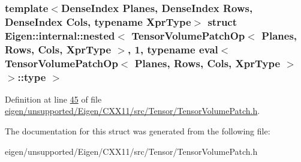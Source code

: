 \subsubsection*{template$<$Dense\+Index Planes, Dense\+Index Rows, Dense\+Index Cols, typename Xpr\+Type$>$\newline
struct Eigen\+::internal\+::nested$<$ Tensor\+Volume\+Patch\+Op$<$ Planes, Rows, Cols, Xpr\+Type $>$, 1, typename eval$<$ Tensor\+Volume\+Patch\+Op$<$ Planes, Rows, Cols, Xpr\+Type $>$ $>$\+::type $>$}



Definition at line \hyperlink{eigen_2unsupported_2_eigen_2_c_x_x11_2src_2_tensor_2_tensor_volume_patch_8h_source_l00045}{45} of file \hyperlink{eigen_2unsupported_2_eigen_2_c_x_x11_2src_2_tensor_2_tensor_volume_patch_8h_source}{eigen/unsupported/\+Eigen/\+C\+X\+X11/src/\+Tensor/\+Tensor\+Volume\+Patch.\+h}.



The documentation for this struct was generated from the following file\+:\begin{DoxyCompactItemize}
\item 
eigen/unsupported/\+Eigen/\+C\+X\+X11/src/\+Tensor/\+Tensor\+Volume\+Patch.\+h\end{DoxyCompactItemize}
